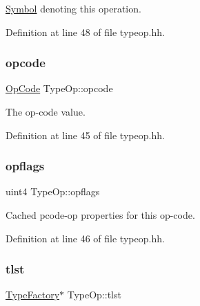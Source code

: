 \mbox{\hyperlink{class_symbol}{Symbol}} denoting this operation. 



Definition at line 48 of file typeop.\+hh.

\mbox{\label{class_type_op_a4cf1a87808c695547bea14f3dc84404c}} 
\subsubsection{\texorpdfstring{opcode}{opcode}}
{\footnotesize\ttfamily \mbox{\hyperlink{opcodes_8hh_abeb7dfb0e9e2b3114e240a405d046ea7}{Op\+Code}} Type\+Op\+::opcode\hspace{0.3cm}{\ttfamily [protected]}}



The op-\/code value. 



Definition at line 45 of file typeop.\+hh.

\mbox{\label{class_type_op_aeb09cfb426122a00d1476e3b8642f1a9}} 
\subsubsection{\texorpdfstring{opflags}{opflags}}
{\footnotesize\ttfamily uint4 Type\+Op\+::opflags\hspace{0.3cm}{\ttfamily [protected]}}



Cached pcode-\/op properties for this op-\/code. 



Definition at line 46 of file typeop.\+hh.

\mbox{\label{class_type_op_a06a48c0a8067e447395c9ccf8e1a8b5c}} 
\subsubsection{\texorpdfstring{tlst}{tlst}}
{\footnotesize\ttfamily \mbox{\hyperlink{class_type_factory}{Type\+Factory}}$\ast$ Type\+Op\+::tlst\hspace{0.3cm}{\ttfamily [protected]}}



